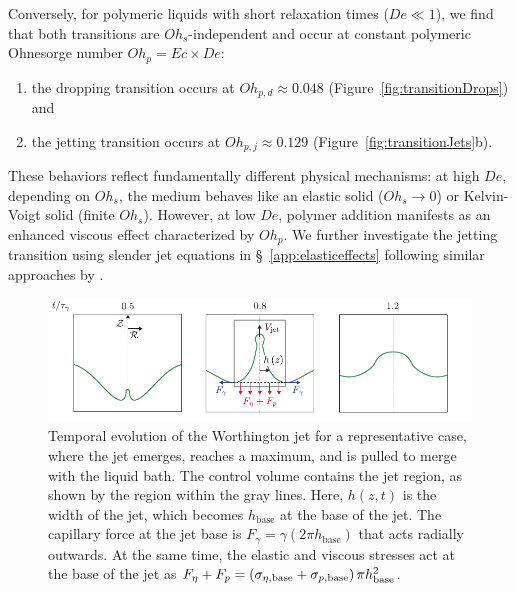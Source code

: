 \documentclass{jfm}
\newcommand{\DL}[1]{{\textcolor{black}{#1}}}
\newcommand{\oo}{\color{magenta} \normalfont}
\newcommand{\bb}{\color{black} \normalfont}
\begin{document}
Conversely, for polymeric liquids with short relaxation times ($De \ll 1$), we find that both transitions are $Oh_s$-independent and occur at constant polymeric Ohnesorge number $Oh_p = Ec \times De$:

\begin{enumerate}
	\item the dropping transition occurs at $Oh_{p,d} \approx 0.048$ (Figure~\ref{fig:transitionDrops}) and
	\item the jetting transition occurs at $Oh_{p,j} \approx 0.129$ (Figure~\ref{fig:transitionJets}b).
\end{enumerate}

\oo

These behaviors reflect fundamentally different physical mechanisms: at high $De$, depending on $Oh_s$, the medium behaves like an elastic solid ($Oh_s \to 0$) or Kelvin-Voigt solid (finite $Oh_s$). However, at low $De$, polymer addition manifests as an enhanced viscous effect characterized by $Oh_p$. \bb
We further investigate the jetting transition using slender jet equations in \S~\ref{app:elasticeffects} following similar approaches by \citet{driessen2013stability,gordillo2020impulsive,zinelis2023transition,sen2024elastocapillary}.

\begin{figure}
	\centering
	\includegraphics[width=\textwidth]{Figures/JetSchematic/jetSchematic_02-eps-converted-to.pdf}
	\caption{
		Temporal evolution of the Worthington jet for a representative case, where the jet emerges, reaches a maximum, and is pulled to merge with the liquid bath. The control volume contains the jet region, as shown by the region within the gray lines. Here, $h(z,t)$ is the width of the jet, which becomes $h_{\text{base}}$ at the base of the jet. The capillary force at the jet base is $F_\gamma = \gamma \left(2 \pi h_{\text{base}} \right)$ that acts radially outwards. At the same time, the elastic and viscous stresses act at the base of the jet as $\DL{F_\eta + F_p  = \left( \sigma_{\eta, \text{base}} + \sigma_{p, \text{base}}\right) \pi h_{\text{base}}^2}$.
	}
	\label{fig:jetSchematic}
\end{figure}
\end{document}
